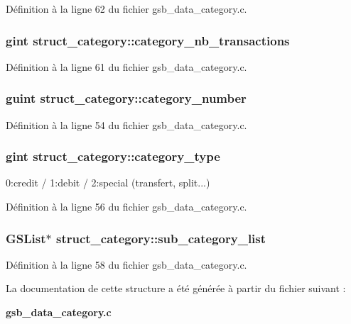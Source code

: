 Définition à la ligne 62 du fichier gsb\_\-data\_\-category.c.

\subsubsection[{category\_\-nb\_\-transactions}]{\setlength{\rightskip}{0pt plus 5cm}gint {\bf struct\_\-category::category\_\-nb\_\-transactions}}\label{structstruct__category_a3b7ab1154ff7c70d32626b5d1c1a7344}


Définition à la ligne 61 du fichier gsb\_\-data\_\-category.c.

\subsubsection[{category\_\-number}]{\setlength{\rightskip}{0pt plus 5cm}guint {\bf struct\_\-category::category\_\-number}}\label{structstruct__category_ada1ad1e27139d386a05370e7bff708b4}


Définition à la ligne 54 du fichier gsb\_\-data\_\-category.c.

\subsubsection[{category\_\-type}]{\setlength{\rightskip}{0pt plus 5cm}gint {\bf struct\_\-category::category\_\-type}}\label{structstruct__category_aa457eb6841ea704f9f2084411dfb641a}
0:credit / 1:debit / 2:special (transfert, split...) 

Définition à la ligne 56 du fichier gsb\_\-data\_\-category.c.

\subsubsection[{sub\_\-category\_\-list}]{\setlength{\rightskip}{0pt plus 5cm}GSList$\ast$ {\bf struct\_\-category::sub\_\-category\_\-list}}\label{structstruct__category_a023b1ad87bcf17b1cb544ce27cc58a46}


Définition à la ligne 58 du fichier gsb\_\-data\_\-category.c.



La documentation de cette structure a été générée à partir du fichier suivant :\begin{DoxyCompactItemize}
\item 
{\bf gsb\_\-data\_\-category.c}\end{DoxyCompactItemize}
